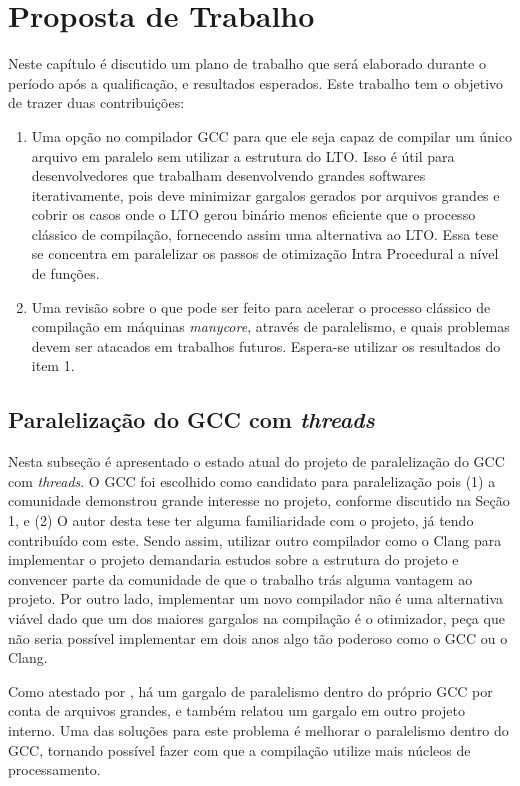 \chapter{Proposta de Trabalho}
\label{chap:proposta}

Neste capítulo é discutido um plano de trabalho que será elaborado
durante o período após a qualificação, e resultados esperados.
Este trabalho tem o objetivo de trazer duas contribuições:
\begin{enumerate}
    \item Uma opção no compilador GCC para que ele seja
capaz de compilar um único arquivo em paralelo sem utilizar a
estrutura do LTO. Isso é útil para desenvolvedores que trabalham
desenvolvendo grandes softwares iterativamente, pois deve minimizar
gargalos gerados por arquivos grandes e cobrir os casos onde o LTO gerou
binário menos eficiente que o processo clássico de compilação, fornecendo assim
uma alternativa ao LTO.
Essa tese se concentra em paralelizar os passos de otimização Intra Procedural
a nível de funções.

    \item Uma revisão sobre o que pode ser feito para acelerar o
processo clássico de compilação em máquinas \textit{manycore}, através
de paralelismo, e quais problemas devem ser atacados em trabalhos futuros.
Espera-se utilizar os resultados do item 1.
\end{enumerate}


\section{Paralelização do GCC com \textit{threads}}

Nesta subseção é apresentado o estado atual do projeto de paralelização
do GCC com \textit{threads}. O GCC foi escolhido como candidato para
paralelização pois (1) a comunidade demonstrou grande interesse no projeto,
conforme discutido na Seção 1, e (2) O autor desta tese ter alguma
familiaridade com o projeto, já tendo contribuído com este. Sendo assim,
utilizar outro compilador como o Clang para implementar o projeto demandaria
estudos sobre a estrutura do projeto e convencer parte da comunidade de que
o trabalho trás alguma vantagem ao projeto. Por outro lado, implementar um
novo compilador não é uma alternativa viável dado que um dos maiores gargalos
na compilação é o otimizador, peça que não seria possível implementar em
dois anos algo tão poderoso como o GCC ou o Clang.

Como atestado por \cite{PR84402}, há um gargalo de paralelismo dentro do
próprio GCC por conta de arquivos grandes, e \cite{mailgcc} também
relatou um gargalo em outro projeto interno. Uma das soluções para este
problema é melhorar o paralelismo dentro do GCC, tornando possível fazer
com que a compilação utilize mais núcleos de processamento.

